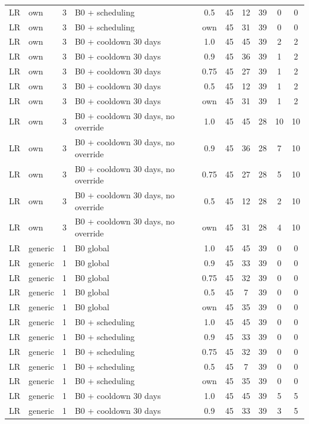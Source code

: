 \begin{longtable}{lllp{4.4cm}cccccc}
LR & own & 3 & B0 + scheduling & 0.5 & 45 & 12 & 39 & 0 & 0 \\
LR & own & 3 & B0 + scheduling & own & 45 & 31 & 39 & 0 & 0 \\
LR & own & 3 & B0 + cooldown 30 days & 1.0 & 45 & 45 & 39 & 2 & 2 \\
LR & own & 3 & B0 + cooldown 30 days & 0.9 & 45 & 36 & 39 & 1 & 2 \\
LR & own & 3 & B0 + cooldown 30 days & 0.75 & 45 & 27 & 39 & 1 & 2 \\
LR & own & 3 & B0 + cooldown 30 days & 0.5 & 45 & 12 & 39 & 1 & 2 \\
LR & own & 3 & B0 + cooldown 30 days & own & 45 & 31 & 39 & 1 & 2 \\
LR & own & 3 & B0 + cooldown 30 days, no override & 1.0 & 45 & 45 & 28 & 10 & 10 \\
LR & own & 3 & B0 + cooldown 30 days, no override & 0.9 & 45 & 36 & 28 & 7 & 10 \\
LR & own & 3 & B0 + cooldown 30 days, no override & 0.75 & 45 & 27 & 28 & 5 & 10 \\
LR & own & 3 & B0 + cooldown 30 days, no override & 0.5 & 45 & 12 & 28 & 2 & 10 \\
LR & own & 3 & B0 + cooldown 30 days, no override & own & 45 & 31 & 28 & 4 & 10 \\
LR & generic & 1 & B0 global & 1.0 & 45 & 45 & 39 & 0 & 0 \\
LR & generic & 1 & B0 global & 0.9 & 45 & 33 & 39 & 0 & 0 \\
LR & generic & 1 & B0 global & 0.75 & 45 & 32 & 39 & 0 & 0 \\
LR & generic & 1 & B0 global & 0.5 & 45 & 7 & 39 & 0 & 0 \\
LR & generic & 1 & B0 global & own & 45 & 35 & 39 & 0 & 0 \\
LR & generic & 1 & B0 + scheduling & 1.0 & 45 & 45 & 39 & 0 & 0 \\
LR & generic & 1 & B0 + scheduling & 0.9 & 45 & 33 & 39 & 0 & 0 \\
LR & generic & 1 & B0 + scheduling & 0.75 & 45 & 32 & 39 & 0 & 0 \\
LR & generic & 1 & B0 + scheduling & 0.5 & 45 & 7 & 39 & 0 & 0 \\
LR & generic & 1 & B0 + scheduling & own & 45 & 35 & 39 & 0 & 0 \\
LR & generic & 1 & B0 + cooldown 30 days & 1.0 & 45 & 45 & 39 & 5 & 5 \\
LR & generic & 1 & B0 + cooldown 30 days & 0.9 & 45 & 33 & 39 & 3 & 5 \\

\end{longtable}
